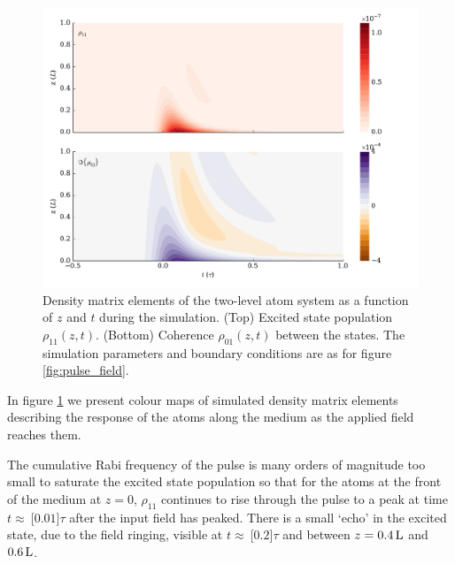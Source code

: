 
    \begin{figure}
    \includegraphics[width=\linewidth]{figs/02_propagation/mb_two_solve_wp_t01_Ng0100_T0_vel0_D0_fig2.pdf}
    \caption{
      Density matrix elements of the two-level atom system as a function of $z$
      and $t$ during the simulation. (Top) Excited state population
      $\rho_{11}(z,t)$. (Bottom) Coherence $\rho_{01}(z,t)$ between the states.
      The simulation parameters and boundary conditions are as for figure
      \ref{fig:pulse_field}.
    }
    \label{fig:pulse_pop_coh}
    \end{figure}

    In figure \ref{fig:pulse_pop_coh} we present colour maps of simulated
    density matrix elements describing the response of the atoms along the
    medium as the applied field reaches them.

    The cumulative Rabi frequency of the pulse is many orders of magnitude too
    small to saturate the excited state population so that for the atoms at the
    front of the medium at $z\!=\!0$, $\rho_{11}$ continues to rise through the
    pulse to a peak at time $t \approx~$\unit[$0.01$]{$\tau$} after the input
    field has peaked. There is a small `echo' in the excited state, due to the
    field ringing, visible at $t \approx~$\unit[$0.2$]{$\tau$} and between $z =
    \unit[0.4]{L}$ and $\unit[0.6]{L}$.


